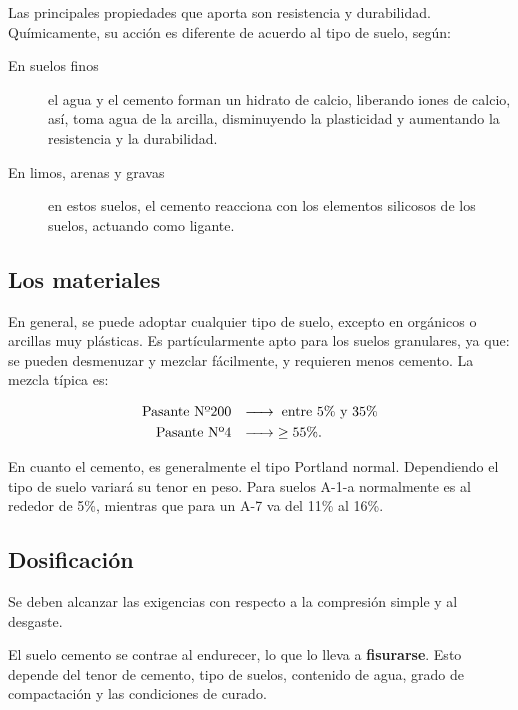 \documentclass[../main.tex]{subfiles}
\begin{document}
Las principales propiedades que aporta son resistencia y durabilidad. Químicamente,
su acción es diferente de acuerdo al tipo de suelo, según:

\begin{description}
  \item[En suelos finos] el agua y el cemento forman un hidrato de calcio,
    liberando iones de calcio, así, toma agua de la arcilla, disminuyendo la
    plasticidad y aumentando la resistencia y la durabilidad.
  \item[En limos, arenas y gravas] en estos suelos, el cemento reacciona con los
    elementos silicosos de los suelos, actuando como ligante.
\end{description}

\subsection{Los materiales}

En general, se puede adoptar cualquier tipo de suelo, excepto en orgánicos o 
arcillas muy plásticas. Es partícularmente apto para los suelos granulares, ya
que: se pueden desmenuzar y mezclar fácilmente, y requieren menos cemento. La
mezcla típica es:

\begin{align*}
  \text{Pasante Nº200} & \hspace{0.25cm} \xrightarrow{\hspace*{0.5cm}} \hspace{0.1cm} \text{entre 5\% y 35\%} \\
  \text{Pasante Nº4} & \hspace{0.25cm} \xrightarrow{\hspace*{0.5cm}} \hspace{0.1cm} \geq 55\% 
.\end{align*}

En cuanto el cemento, es generalmente el tipo Portland normal. Dependiendo el 
tipo de suelo variará su tenor en peso. Para suelos A-1-a normalmente es al
rededor de 5\%, mientras que para un A-7 va del 11\% al 16\%.

\subsection{Dosificación}

Se deben alcanzar las exigencias con respecto a la compresión simple y al
desgaste.

El suelo cemento se contrae al endurecer, lo que lo lleva a \textbf{fisurarse}.
Esto depende del tenor de cemento, tipo de suelos, contenido de agua, grado de 
compactación y las condiciones de curado. 
\end{document}
